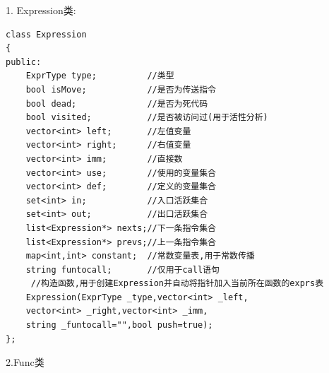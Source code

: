 \documentclass[UTF8]{article}
\begin{document}
1. Expression类:
\begin{lstlisting}
class Expression
{
public:
    ExprType type;          //类型
    bool isMove;            //是否为传送指令
    bool dead;              //是否为死代码
    bool visited;           //是否被访问过(用于活性分析)
    vector<int> left;       //左值变量
    vector<int> right;      //右值变量
    vector<int> imm;        //直接数
    vector<int> use;        //使用的变量集合
    vector<int> def;        //定义的变量集合
    set<int> in;            //入口活跃集合
    set<int> out;           //出口活跃集合
    list<Expression*> nexts;//下一条指令集合
    list<Expression*> prevs;//上一条指令集合
    map<int,int> constant;  //常数变量表,用于常数传播
    string funtocall;       //仅用于call语句
     //构造函数,用于创建Expression并自动将指针加入当前所在函数的exprs表
    Expression(ExprType _type,vector<int> _left,
    vector<int> _right,vector<int> _imm,
    string _funtocall="",bool push=true);
};
\end{lstlisting}
2.Func类
\end{document}
